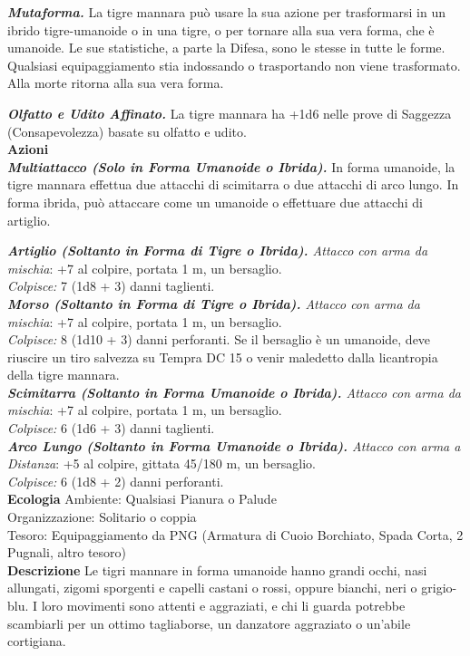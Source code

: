\begin{multicols}{2}
\emph{\textbf{Mutaforma.}} La tigre mannara può usare la sua azione per trasformarsi in un ibrido tigre-umanoide o in una tigre, o per tornare alla sua vera forma, che è umanoide. Le sue statistiche, a parte la Difesa, sono le stesse in tutte le forme. Qualsiasi equipaggiamento stia indossando o trasportando non viene trasformato. Alla morte ritorna alla sua vera forma.

\emph{\textbf{Olfatto e Udito Affinato.}} La tigre mannara ha +1d6 nelle prove di Saggezza (Consapevolezza) basate su olfatto e udito.\\

\smallskip\textbf{Azioni}\\

\emph{\textbf{Multiattacco (Solo in Forma Umanoide o Ibrida).}} In forma umanoide, la tigre mannara effettua due attacchi di scimitarra o due attacchi di arco lungo. In forma ibrida, può attaccare come un umanoide o effettuare due attacchi di artiglio.

\emph{\textbf{Artiglio (Soltanto in Forma di Tigre o Ibrida).} Attacco con arma da mischia}: +7 al colpire, portata 1 m, un bersaglio.\\
\emph{Colpisce:} 7 (1d8 + 3) danni taglienti.\\

\emph{\textbf{Morso (Soltanto in Forma di Tigre o Ibrida).} Attacco con arma da mischia}: +7 al colpire, portata 1 m, un bersaglio.\\
\emph{Colpisce:} 8 (1d10 + 3) danni perforanti. Se il bersaglio è un umanoide, deve riuscire un tiro salvezza su Tempra DC  15 o venir maledetto dalla licantropia della tigre mannara.\\

\emph{\textbf{Scimitarra (Soltanto in Forma Umanoide o Ibrida).} Attacco con arma da mischia}: +7 al colpire, portata 1 m, un bersaglio.\\
\emph{Colpisce:} 6 (1d6 + 3) danni taglienti.\\

\emph{\textbf{Arco Lungo (Soltanto in Forma Umanoide o Ibrida).} Attacco con arma a Distanza}: +5 al colpire, gittata 45/180 m, un bersaglio.\\

\emph{Colpisce:} 6 (1d8 + 2) danni perforanti.\\
\textbf{Ecologia}
Ambiente: Qualsiasi Pianura o Palude\\
Organizzazione: Solitario o coppia\\
Tesoro: Equipaggiamento da PNG (Armatura di Cuoio Borchiato, Spada Corta, 2 Pugnali, altro tesoro)\\
\textbf{Descrizione}
Le tigri mannare in forma umanoide hanno grandi occhi, nasi allungati, zigomi sporgenti e capelli castani o rossi, oppure bianchi, neri o grigio-blu. I loro movimenti sono attenti e aggraziati, e chi li guarda potrebbe scambiarli per un ottimo tagliaborse, un danzatore aggraziato o un’abile cortigiana.\\


\end{multicols}
